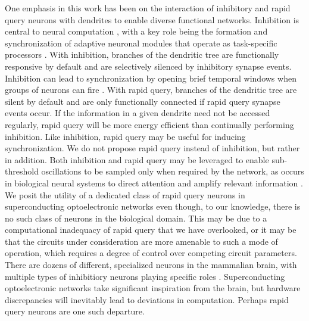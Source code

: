 \documentclass[twocolumn]{article}
\begin{document}
One emphasis in this work has been on the interaction of inhibitory and rapid query neurons with dendrites to enable diverse functional networks. Inhibition is central to neural computation \cite{robu2015}, with a key role being the formation and synchronization of adaptive neuronal modules that operate as task-specific processors \cite{vala2001,sase2001}. With inhibition, branches of the dendritic tree are functionally responsive by default and are selectively silenced by inhibitory synapse events. Inhibition can lead to synchronization by opening brief temporal windows when groups of neurons can fire \cite{bu2006}. With rapid query, branches of the dendritic tree are silent by default and are only functionally connected if rapid query synapse events occur. If the information in a given dendrite need not be accessed regularly, rapid query will be more energy efficient than continually performing inhibition. Like inhibition, rapid query may be useful for inducing synchronization. We do not propose rapid query instead of inhibition, but rather in addition. Both inhibition and rapid query may be leveraged to enable sub-threshold oscillations to be sampled only when required by the network, as occurs in biological neural systems to direct attention and amplify relevant information \cite{enfr2001}. We posit the utility of a dedicated class of rapid query neurons in superconducting optoelectronic networks even though, to our knowledge, there is no such class of neurons in the biological domain. This may be due to a computational inadequacy of rapid query that we have overlooked, or it may be that the circuits under consideration are more amenable to such a mode of operation, which requires a degree of control over competing circuit parameters. There are dozens of different, specialized neurons in the mammalian brain, with multiple types of inhibitiory neurons playing specific roles \cite{robu2015,bu2006}. Superconducting optoelectronic networks take significant inspiration from the brain, but hardware discrepancies will inevitably lead to deviations in computation. Perhaps rapid query neurons are one such departure.
\end{document}
